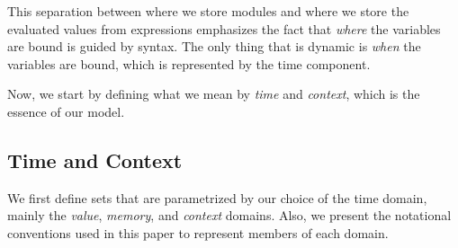 \documentclass[acmsmall,screen]{acmart}
\theoremstyle{definition}
\begin{document}
This separation between where we store modules and where we store the evaluated values from expressions emphasizes the fact that \emph{where} the variables are bound is guided by syntax.
The only thing that is dynamic is \emph{when} the variables are bound, which is represented by the time component.

Now, we start by defining what we mean by \emph{time} and \emph{context}, which is the essence of our model.

\subsection{Time and Context}

We first define sets that are parametrized by our choice of the time domain, mainly the \emph{value}, \emph{memory}, and \emph{context} domains.
Also, we present the notational conventions used in this paper to represent members of each domain.
\end{document}

